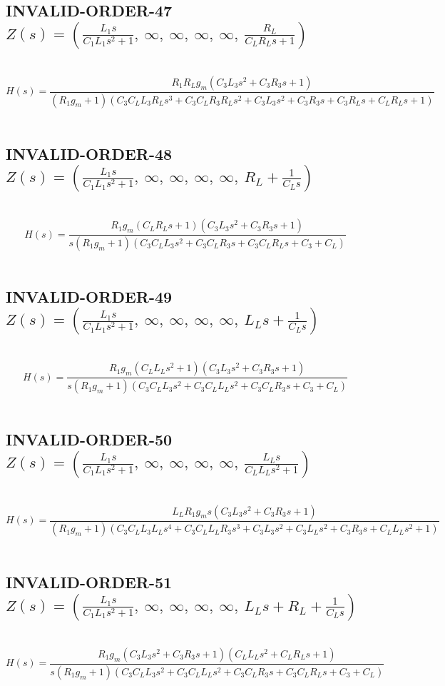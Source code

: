 \documentclass{article}
\begin{document}
\subsection{INVALID-ORDER-47 $Z(s) = \left( \frac{L_{1} s}{C_{1} L_{1} s^{2} + 1}, \  \infty, \  \infty, \  \infty, \  \infty, \  \frac{R_{L}}{C_{L} R_{L} s + 1}\right)$ } \ 
\textbf{\[H(s) = \frac{R_{1} R_{L} g_{m} \left(C_{3} L_{3} s^{2} + C_{3} R_{3} s + 1\right)}{\left(R_{1} g_{m} + 1\right) \left(C_{3} C_{L} L_{3} R_{L} s^{3} + C_{3} C_{L} R_{3} R_{L} s^{2} + C_{3} L_{3} s^{2} + C_{3} R_{3} s + C_{3} R_{L} s + C_{L} R_{L} s + 1\right)}\] } \ 
\subsection{INVALID-ORDER-48 $Z(s) = \left( \frac{L_{1} s}{C_{1} L_{1} s^{2} + 1}, \  \infty, \  \infty, \  \infty, \  \infty, \  R_{L} + \frac{1}{C_{L} s}\right)$ } \ 
\textbf{\[H(s) = \frac{R_{1} g_{m} \left(C_{L} R_{L} s + 1\right) \left(C_{3} L_{3} s^{2} + C_{3} R_{3} s + 1\right)}{s \left(R_{1} g_{m} + 1\right) \left(C_{3} C_{L} L_{3} s^{2} + C_{3} C_{L} R_{3} s + C_{3} C_{L} R_{L} s + C_{3} + C_{L}\right)}\] } \ 
\subsection{INVALID-ORDER-49 $Z(s) = \left( \frac{L_{1} s}{C_{1} L_{1} s^{2} + 1}, \  \infty, \  \infty, \  \infty, \  \infty, \  L_{L} s + \frac{1}{C_{L} s}\right)$ } \ 
\textbf{\[H(s) = \frac{R_{1} g_{m} \left(C_{L} L_{L} s^{2} + 1\right) \left(C_{3} L_{3} s^{2} + C_{3} R_{3} s + 1\right)}{s \left(R_{1} g_{m} + 1\right) \left(C_{3} C_{L} L_{3} s^{2} + C_{3} C_{L} L_{L} s^{2} + C_{3} C_{L} R_{3} s + C_{3} + C_{L}\right)}\] } \ 
\subsection{INVALID-ORDER-50 $Z(s) = \left( \frac{L_{1} s}{C_{1} L_{1} s^{2} + 1}, \  \infty, \  \infty, \  \infty, \  \infty, \  \frac{L_{L} s}{C_{L} L_{L} s^{2} + 1}\right)$ } \ 
\textbf{\[H(s) = \frac{L_{L} R_{1} g_{m} s \left(C_{3} L_{3} s^{2} + C_{3} R_{3} s + 1\right)}{\left(R_{1} g_{m} + 1\right) \left(C_{3} C_{L} L_{3} L_{L} s^{4} + C_{3} C_{L} L_{L} R_{3} s^{3} + C_{3} L_{3} s^{2} + C_{3} L_{L} s^{2} + C_{3} R_{3} s + C_{L} L_{L} s^{2} + 1\right)}\] } \ 
\subsection{INVALID-ORDER-51 $Z(s) = \left( \frac{L_{1} s}{C_{1} L_{1} s^{2} + 1}, \  \infty, \  \infty, \  \infty, \  \infty, \  L_{L} s + R_{L} + \frac{1}{C_{L} s}\right)$ } \ 
\textbf{\[H(s) = \frac{R_{1} g_{m} \left(C_{3} L_{3} s^{2} + C_{3} R_{3} s + 1\right) \left(C_{L} L_{L} s^{2} + C_{L} R_{L} s + 1\right)}{s \left(R_{1} g_{m} + 1\right) \left(C_{3} C_{L} L_{3} s^{2} + C_{3} C_{L} L_{L} s^{2} + C_{3} C_{L} R_{3} s + C_{3} C_{L} R_{L} s + C_{3} + C_{L}\right)}\] } \ 
\end{document}
